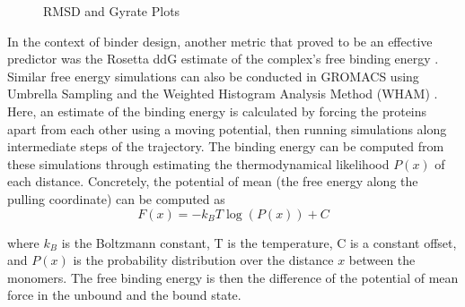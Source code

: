 \begin{figure}
    
    \caption{RMSD and Gyrate Plots}
    \label{fig:gromacs_rmsd_gyrate}
\end{figure}

In the context of binder design, another metric that proved to be an effective predictor was the Rosetta ddG estimate of the complex's free binding energy \cite{physics_binder_design}. Similar free energy simulations can also be conducted in GROMACS using Umbrella Sampling and the Weighted Histogram Analysis Method (WHAM) \cite{wham_method}. Here, an estimate of the binding energy is calculated by forcing the proteins apart from each other using a moving potential, then running simulations along intermediate steps of the trajectory. The binding energy can be computed from these simulations through estimating the thermodynamical likelihood $P(x)$ of each distance. Concretely, the potential of mean (the free energy along the pulling coordinate) can be computed as 
\begin{equation}
    F(x) = -k_B T \log(P(x)) + C
\end{equation}

where $k_B$ is the Boltzmann constant, T is the temperature, C is a constant offset, and $P(x)$ is the probability distribution over the distance $x$ between the monomers. The free binding energy is then the difference of the potential of mean force in the unbound and the bound state. 

